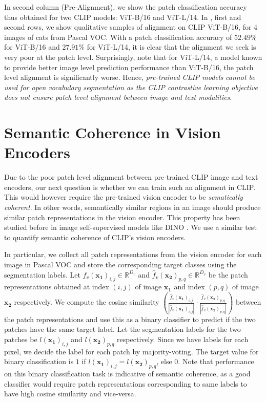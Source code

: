 \documentclass[10pt,twocolumn,letterpaper]{article}
\begin{document}
In  second column (Pre-Alignment), we show the patch classification accuracy thus obtained for two CLIP models: ViT-B/16 and ViT-L/14. In , first and second rows, we show qualitative samples of alignment on CLIP ViT-B/16, for 4 images of cats from Pascal VOC. With a patch classification accuracy of $52.49\%$ for ViT-B/16 and $27.91\%$ for ViT-L/14, it is clear that the alignment we seek is very poor at the patch level. Surprisingly, note that for ViT-L/14, a model known to provide better image level prediction performance than ViT-B/16, the patch level alignment is significantly worse. Hence, \emph{pre-trained CLIP models cannot be used for open vocabulary segmentation as the CLIP contrastive learning objective does not ensure patch level alignment between image and text modalities}.

\section{Semantic Coherence in Vision Encoders}
\label{sec:semantic_coherence}

Due to the poor patch level alignment between pre-trained CLIP image and text encoders, our next question is whether we can train such an alignment in CLIP. This would however require the pre-trained vision encoder to be \emph{sematically coherent}. In other words, semantically similar regions in an image should produce similar patch representations in the vision encoder. This property has been studied before in image self-supervised models like DINO \cite{hamilton2022unsupervised}. We use a similar test to quantify semantic coherence of CLIP's vision encoders.

In particular, we collect all patch representations from the vision encoder for each image in Pascal VOC and store the corresponding target classes using the segmentation labels. Let $\hat{f}_v(\mathbf{x_1})_{i, j} \in \mathbb{R}^{D_v}$ and $\hat{f}_v(\mathbf{x_2})_{p, q} \in \mathbb{R}^{D_v}$ be the patch representations obtained at index $(i, j)$ of image $\mathbf{x_1}$ and index $(p, q)$ of image $\mathbf{x_2}$ respectively. We compute the cosine similarity $\left(\frac{\hat{f}_v(\mathbf{x_1})_{i, j}}{|\hat{f}_v(\mathbf{x_1})_{i, j}|} \cdot \frac{\hat{f}_v(\mathbf{x_2})_{p, q}}{|\hat{f}_v(\mathbf{x_2})_{p, q}|}\right)$ between the patch representations and use this as a binary classifier to predict if the two patches have the same target label. Let the segmentation labels for the two patches be $l(\mathbf{x_1})_{i, j}$ and $l(\mathbf{x_2})_{p, q}$ respectively. Since we have labels for each pixel, we decide the label for each patch by majority-voting. The target value for binary classification is $1$ if $l(\mathbf{x_1})_{i, j} = l(\mathbf{x_2})_{p, q}$, else $0$. Note that performance on this binary classification task is indicative of semantic coherence, as a good classifier would require patch representations corresponding to same labels to have high cosine similarity and vice-versa.
\end{document}

